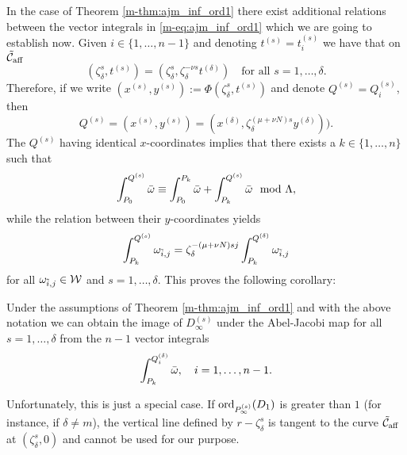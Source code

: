\documentclass[main.tex]{subfiles}
\begin{document}
    In the case of Theorem \ref{m-thm:ajm_inf_ord1} there exist additional relations between the vector integrals in
    \eqref{m-eq:ajm_inf_ord1} which we are going to establish now.
      Given $i \in \{1,\dots,n-1\}$ and denoting $t^{(s)} = t_i^{(s)}$ we have that on $\tilde{\mathcal{C}}_{\text{aff}}$
     \begin{equation*}
	( \zeta_{\delta}^s,t^{(s)} ) = ( \zeta_{\delta}^s, \zeta_{\delta}^{-\nu s} t^{(\delta)} ) \quad \text{for all $s=1,\dots,\delta$.}
     \end{equation*}
     Therefore, if we write $(x^{(s)},y^{(s)}) :=  \Phi( \zeta_{\delta}^s,t^{(s)})$ and denote  $Q^{(s)} = Q_i^{(s)}$, then
     \begin{equation*}
      Q^{(s)} = (x^{(s)},y^{(s)}) = (x^{(\delta)},\zeta_{\delta}^{(\mu+\nu N)s} y^{(\delta)})).
     \end{equation*}
     The $Q^{(s)}$ having identical $x$-coordinates implies that there exists a $k \in \{1,\dots,n\}$ such that
     \begin{equation*}
      \int_{P_0}^{Q^{(s)}} \bar{\omega} \equiv  \int_{P_0}^{P_k} \bar{\omega}  +  \int_{P_k}^{Q^{(s)}}  \bar{\omega} \mod \Lambda,
     \end{equation*}
     while the relation between their $y$-coordinates yields
     \begin{equation*}
       \int_{P_k}^{Q^{(s)}} \omega_{\tilde{i},j} = \zeta_{\delta}^{-(\mu+\nu N)sj} \int_{P_k}^{Q^{(\delta)}} \omega_{\tilde{i},j}
     \end{equation*}
     for all $\omega_{\tilde{i},j} \in \mathcal{W}$ and $s = 1,\dots,\delta$. This proves the following corollary:

    \begin{coro}\label{coro:ajm_inf_ord1}
    Under the assumptions of Theorem \ref{m-thm:ajm_inf_ord1} and with the above notation we can obtain the
    image of $D_{\infty}^{(s)}$ under the Abel-Jacobi map
    for all $s = 1,\dots,\delta$ from the $n-1$ vector integrals
    \begin{equation*}
     \int_{P_k}^{Q_i^{(\delta)}} \bar{\omega}, \quad i = 1,\dots,n-1.
    \end{equation*}
    \end{coro}


    \bigskip

    Unfortunately, this is just a special case. If $\operatorname{ord}_{P_{\infty}^{(s)}}(D_1)$ is greater than $1$ (for instance, if $\delta \ne m$),
     the vertical line defined by $r-\zeta_{\delta}^s$ is tangent to the curve $\tilde{\mathcal{C}}_{\text{aff}}$
    at $(\zeta_{\delta}^s,0)$ and cannot be used for our purpose.
\end{document}
